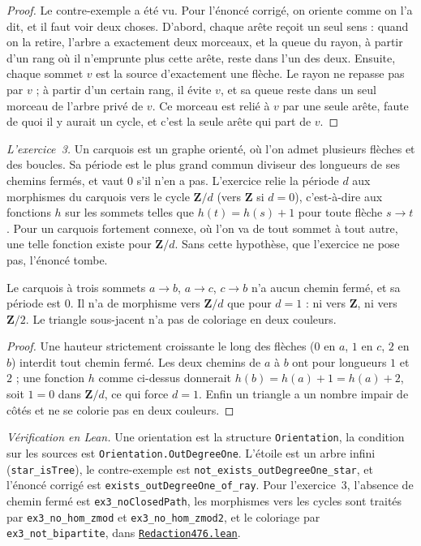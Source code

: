 \begin{proof}
Le contre-exemple a été vu. Pour l'énoncé corrigé, on oriente comme on l'a dit, et il faut voir deux choses. D'abord, chaque arête reçoit un seul sens : quand on la retire, l'arbre a exactement deux morceaux, et la queue du rayon, à partir d'un rang où il n'emprunte plus cette arête, reste dans l'un des deux. Ensuite, chaque sommet $v$ est la source d'exactement une flèche. Le rayon ne repasse pas par $v$ ; à partir d'un certain rang, il évite $v$, et sa queue reste dans un seul morceau de l'arbre privé de $v$. Ce morceau est relié à $v$ par une seule arête, faute de quoi il y aurait un cycle, et c'est la seule arête qui part de $v$.
\end{proof}

\emph{L'exercice~3.} Un carquois est un graphe orienté, où l'on admet plusieurs flèches et des boucles. Sa période est le plus grand commun diviseur des longueurs de ses chemins fermés, et vaut $0$ s'il n'en a pas. L'exercice relie la période $d$ aux morphismes du carquois vers le cycle $\mathbf Z/d$ (vers $\mathbf Z$ si $d = 0$), c'est-à-dire aux fonctions $h$ sur les sommets telles que $h(t) = h(s) + 1$ pour toute flèche $s \to t$. Pour un carquois fortement connexe, où l'on va de tout sommet à tout autre, une telle fonction existe pour $\mathbf Z/d$. Sans cette hypothèse, que l'exercice ne pose pas, l'énoncé tombe.

\begin{encadre}
\begin{contrexemple}
Le carquois à trois sommets $a \to b$, $a \to c$, $c \to b$ n'a aucun chemin fermé, et sa période est $0$. Il n'a de morphisme vers $\mathbf Z/d$ que pour $d = 1$ : ni vers $\mathbf Z$, ni vers $\mathbf Z/2$. Le triangle sous-jacent n'a pas de coloriage en deux couleurs.
\end{contrexemple}
\end{encadre}

\begin{proof}
Une hauteur strictement croissante le long des flèches ($0$ en $a$, $1$ en $c$, $2$ en $b$) interdit tout chemin fermé. Les deux chemins de $a$ à $b$ ont pour longueurs $1$ et $2$ ; une fonction $h$ comme ci-dessus donnerait $h(b) = h(a) + 1 = h(a) + 2$, soit $1 = 0$ dans $\mathbf Z/d$, ce qui force $d = 1$. Enfin un triangle a un nombre impair de côtés et ne se colorie pas en deux couleurs.
\end{proof}

\noindent\emph{Vérification en Lean.} Une orientation est la structure \texttt{Orientation}, la condition sur les sources est \texttt{Orientation.\allowbreak{}OutDegreeOne}. L'étoile est un arbre infini (\texttt{star\_isTree}), le contre-exemple est \texttt{not\_exists\_outDegreeOne\_star}, et l'énoncé corrigé est \texttt{exists\_outDegreeOne\_of\_ray}. Pour l'exercice~3, l'absence de chemin fermé est \texttt{ex3\_noClosedPath}, les morphismes vers les cycles sont traités par \texttt{ex3\_no\_hom\_zmod} et \texttt{ex3\_no\_hom\_zmod2}, et le coloriage par \texttt{ex3\_not\_bipartite}, dans \href{\leanblobmain/Redaction476.lean}{\texttt{Redaction476.\allowbreak{}lean}}.

